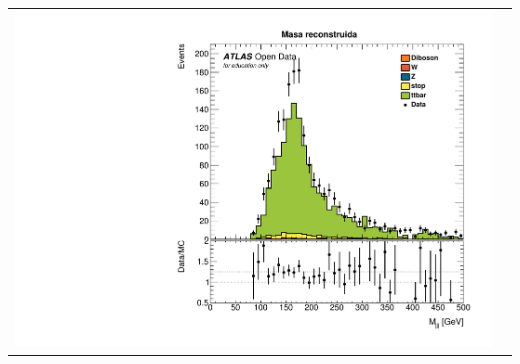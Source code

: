 \documentclass[10pt]{beamer}
\begin{document}
\begin{frame}
\begin{center}
\begin{tabular}{cc}
		\includegraphics[scale=0.22]{reconsmassbis} \\
		
	

		
	\end{tabular}
\end{center}
\end{frame}
\end{document}
